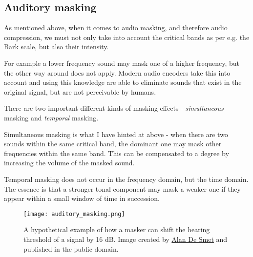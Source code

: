 \subsection{Auditory masking}
As mentioned above, when it comes to audio masking, and therefore audio compression, we must not only take into account the critical bands as per e.g. the Bark scale, but also their intensity.

For example a lower frequency sound may mask one of a higher frequency, but the other way around does not apply. \cite{gelfand1990hearing} Modern audio encoders take this into account and using this knowledge are able to eliminate sounds that exist in the original signal, but are not perceivable by humans.

There are two important different kinds of masking effects - \emph{simultaneous} masking and \emph{temporal} masking. \cite{Raissi2002TheTB}

Simultaneous masking is what I have hinted at above - when there are two sounds within the same critical band, the dominant one may mask other frequencies within the same band. This can be compensated to a degree by increasing the volume of the masked sound.

Temporal masking does not occur in the frequency domain, but the time domain. The essence is that a stronger tonal component may mask a weaker one if they appear within a small window of time in succession.

\begin{figure}[ht]
	\caption[Auditory masking]{A hypothetical example of how a masker can shift the hearing threshold of a signal by 16 dB. Image created by \href{http://www.highprogrammer.com/alan/}{Alan De Smet} and published in the public domain.}
	\centering
	\texttt{[image: auditory\_masking.png]}
\end{figure}
